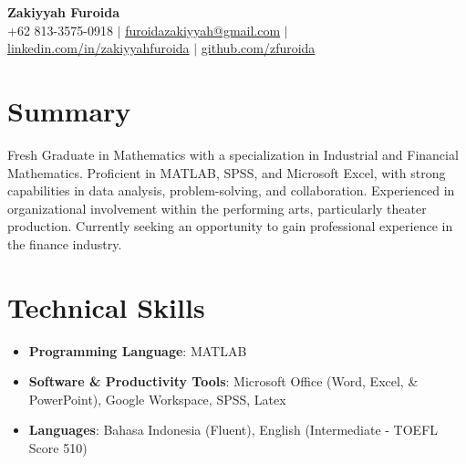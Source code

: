 \documentclass[letterpaper,10pt]{article}
\newcommand{\resumeItem}[1]{\item\small{#1}}
\newcommand{\resumeSubHeadingList}{\begin{itemize}[leftmargin=0.15in, label={}]}
\newcommand{\resumeSubHeadingListEnd}{\end{itemize}}
\begin{document}
\begin{center}
  \textbf{\Huge Zakiyyah Furoida} \\
  \small +62 813-3575-0918 $|$ \href{mailto:furoidazakiyyah@gmail.com}{furoidazakiyyah@gmail.com} $|$ 
  \href{https://www.linkedin.com/in/zakiyyahfuroida/}{linkedin.com/in/zakiyyahfuroida} $|$
  \href{https://github.com/zfuroida}{github.com/zfuroida}
\end{center}

\section*{Summary}
Fresh Graduate in Mathematics with a specialization in Industrial and Financial Mathematics. Proficient in MATLAB, SPSS, and Microsoft Excel, with strong capabilities in data analysis, problem-solving, and collaboration. Experienced in organizational involvement within the performing arts, particularly theater production. Currently seeking an opportunity to gain professional experience in the finance industry.

\section{Technical Skills}
\resumeSubHeadingList
  \resumeItem{\textbf{Programming Language}: MATLAB}
  \resumeItem{\textbf{Software \& Productivity Tools}: Microsoft Office (Word, Excel, \& PowerPoint), Google Workspace, SPSS, Latex}
  \resumeItem{\textbf{Languages}: Bahasa Indonesia (Fluent), English (Intermediate - TOEFL Score 510)}
\resumeSubHeadingListEnd
\end{document}
